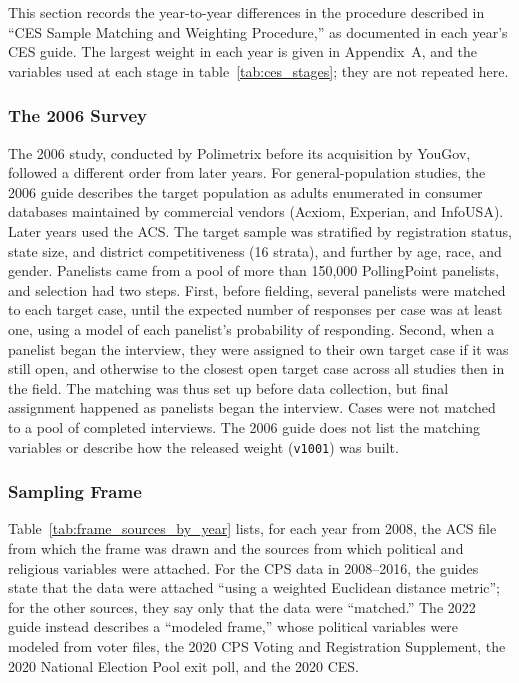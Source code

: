 \documentclass[12pt]{article}
\begin{document}
This section records the year-to-year differences in the procedure described in ``CES Sample Matching and Weighting Procedure,'' as documented in each year's CES guide. The largest weight in each year is given in Appendix~A, and the variables used at each stage in table~\ref{tab:ces_stages}; they are not repeated here.

\subsubsection*{The 2006 Survey}
The 2006 study, conducted by Polimetrix before its acquisition by YouGov, followed a different order from later years. For general-population studies, the 2006 guide describes the target population as adults enumerated in consumer databases maintained by commercial vendors (Acxiom, Experian, and InfoUSA). Later years used the ACS. The target sample was stratified by registration status, state size, and district competitiveness (16 strata), and further by age, race, and gender. Panelists came from a pool of more than 150,000 PollingPoint panelists, and selection had two steps. First, before fielding, several panelists were matched to each target case, until the expected number of responses per case was at least one, using a model of each panelist's probability of responding. Second, when a panelist began the interview, they were assigned to their own target case if it was still open, and otherwise to the closest open target case across all studies then in the field. The matching was thus set up before data collection, but final assignment happened as panelists began the interview. Cases were not matched to a pool of completed interviews. The 2006 guide does not list the matching variables or describe how the released weight (\texttt{v1001}) was built.

\subsubsection*{Sampling Frame}
Table~\ref{tab:frame_sources_by_year} lists, for each year from 2008, the ACS file from which the frame was drawn and the sources from which political and religious variables were attached. For the CPS data in 2008--2016, the guides state that the data were attached ``using a weighted Euclidean distance metric''; for the other sources, they say only that the data were ``matched.'' The 2022 guide instead describes a ``modeled frame,'' whose political variables were modeled from voter files, the 2020 CPS Voting and Registration Supplement, the 2020 National Election Pool exit poll, and the 2020 CES.
\end{document}
